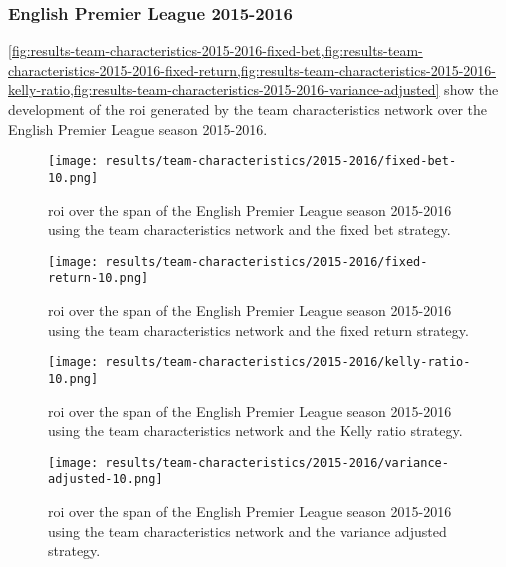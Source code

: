 \subsubsection{English Premier League 2015-2016}

\cref{fig:results-team-characteristics-2015-2016-fixed-bet,fig:results-team-characteristics-2015-2016-fixed-return,fig:results-team-characteristics-2015-2016-kelly-ratio,fig:results-team-characteristics-2015-2016-variance-adjusted} show the development of the \gls{roi} generated by the team characteristics network over the English Premier League season 2015-2016.
\begin{figure}
    \centering
    \texttt{[image: results/team-characteristics/2015-2016/fixed-bet-10.png]}
    \caption{\gls{roi} over the span of the English Premier League season 2015-2016 using the team characteristics network and the fixed bet strategy.}
    \label{fig:results-team-characteristics-2015-2016-fixed-bet}
\end{figure}
\begin{figure}
    \centering
    \texttt{[image: results/team-characteristics/2015-2016/fixed-return-10.png]}
    \caption{\gls{roi} over the span of the English Premier League season 2015-2016 using the team characteristics network and the fixed return strategy.}
    \label{fig:results-team-characteristics-2015-2016-fixed-return}
\end{figure}
\begin{figure}
    \centering
    \texttt{[image: results/team-characteristics/2015-2016/kelly-ratio-10.png]}
    \caption{\gls{roi} over the span of the English Premier League season 2015-2016 using the team characteristics network and the Kelly ratio strategy.}
    \label{fig:results-team-characteristics-2015-2016-kelly-ratio}
\end{figure}
\begin{figure}
    \centering
    \texttt{[image: results/team-characteristics/2015-2016/variance-adjusted-10.png]}
    \caption{\gls{roi} over the span of the English Premier League season 2015-2016 using the team characteristics network and the variance adjusted strategy.}
    \label{fig:results-team-characteristics-2015-2016-variance-adjusted}
\end{figure}

